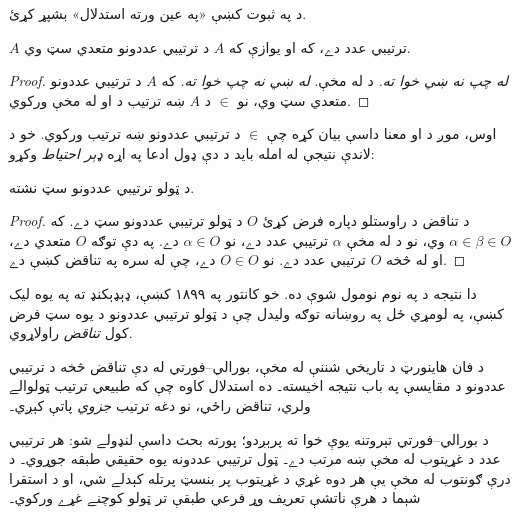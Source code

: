 \documentclass[../../../include/open-logic-section]{subfiles}
\begin{document}
\begin{prob}
د  په ثبوت کښې «په عين ورته
استدلال» بشپړ کړئ.
\end{prob}

\begin{cor}
$A$ ترتيبي عدد دے، که او يوازې که $A$ د ترتيبي عددونو متعدي سټ وي.
\end{cor}

\begin{proof}
\emph{له چپ نه ښي خوا ته.} د  له مخې.
\emph{له ښي نه چپ خوا ته.} که $A$ د ترتيبي عددونو متعدي سټ وي، نو
$\in$ د $A$ ښه ترتيب د  او
 له مخې ورکوي.
\end{proof}

اوس، موږ د
 او  معنا داسې بيان کړه چې
$\in$ د ترتيبي عددونو ښه ترتيب ورکوي. خو د لاندې نتيجې له امله بايد
د دې ډول ادعا په اړه \emph{ډېر احتياط} وکړو:

\begin{thm}
د ټولو ترتيبي عددونو سټ نشته.
\end{thm}

\begin{proof}
د تناقض د راوستلو دپاره فرض کړئ $O$ د ټولو ترتيبي عددونو سټ دے.
که $\alpha \in
\beta \in O$ وي، نو د  له مخې $\alpha$ ترتيبي عدد دے،
نو $\alpha \in O$ دے. په دې توګه $O$ متعدي دے، او له
 څخه $O$ ترتيبي عدد دے. نو $O \in O$ دے، چې له
 سره په تناقض کښې دے.
\end{proof}
\noindent
دا نتيجه د \citeauthor{Burali-Forti1897} په نوم نومول شوې ده. خو کانتور په
۱۸۹۹ کښې، ډېډېکنډ ته په يوه ليک کښې، په لومړي ځل په روښانه توګه وليدل
چې د ټولو ترتيبي عددونو د يوه سټ فرض کول \emph{تناقض} راولاړوي.
\begin{explain}
  د فان هاينورټ د تاريخي شننې له مخې، بورالي--فورتي له دې تناقض
  څخه د ترتيبي عددونو د مقايسې په باب نتيجه اخيسته۔ ده استدلال کاوه
  چې که طبيعي ترتيب ټولوالے ولري، تناقض راځي، نو دغه ترتيب
  \emph{جزوي} پاتې کېږي۔ \citep[p.~105]{Heijenoort1967}
\end{explain}
د بورالي--فورتي تېروتنه يوې خوا ته پرېږدو؛ پورته بحث داسې لنډولے شو:
هر ترتيبي عدد د غړيتوب له مخې ښه مرتب دے۔ ټول ترتيبي
عددونه يوه حقيقي طبقه جوړوي۔ د درې ګونتوب له مخې يې هر دوه
غړي د غړيتوب پر بنسټ پرتله کېدلے شي، او د استقرا شېما د
هرې ناتشې تعريف وړ فرعي طبقې تر ټولو کوچنے غړے ورکوي۔
\end{document}
